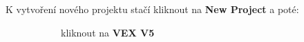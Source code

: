 \documentclass[../main.tex]{subfiles}
\begin{document}
	K vytvoření nového projektu stačí kliknout na \textbf{New Project} a poté:

	\begin{figure}[h!]%
		\begin{subfigure}{.3\textwidth}%
			\centering%
			\caption{kliknout na \textbf{VEX V5}}%
		\end{subfigure} \hspace{.045\textwidth}%
		\begin{subfigure}{.3\textwidth}%
			\centering%

\end{subfigure}
\end{figure}
\end{document}
